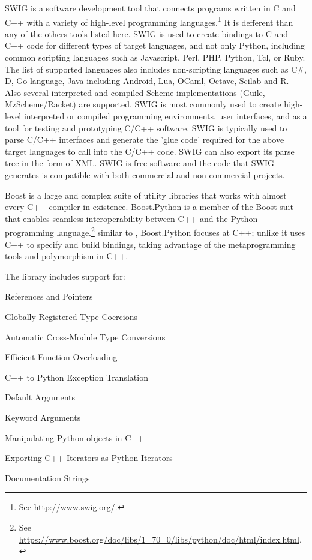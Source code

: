
SWIG is a software development tool that connects programs written in
C and C++ with a variety of high-level programming
languages.\footnote{See \url{http://www.swig.org/}.}  It is defferent
than any of the others tools listed here.  SWIG is used to create
bindings to C and C++ code for different types of target languages,
and not only Python, including common scripting languages such as
Javascript, Perl, PHP, Python, Tcl, or Ruby. The list of supported
languages also includes non-scripting languages such as C\#, D, Go
language, Java including Android, Lua, OCaml, Octave, Scilab and
R. Also several interpreted and compiled Scheme implementations
(Guile, MzScheme/Racket) are supported. SWIG is most commonly used to
create high-level interpreted or compiled programming environments,
user interfaces, and as a tool for testing and prototyping C/C++
software. SWIG is typically used to parse C/C++ interfaces and
generate the 'glue code' required for the above target languages to
call into the C/C++ code. SWIG can also export its parse tree in the
form of XML. SWIG is free software and the code that SWIG generates is
compatible with both commercial and non-commercial projects.

Boost is a large and complex suite of utility libraries that works
with almost every C++ compiler in existence. Boost.Python is a member
of the Boost suit that enables seamless interoperability between C++
and the Python programming language.\footnote{See
  \url{https://www.boost.org/doc/libs/1_70_0/libs/python/doc/html/index.html}.}
similar to , Boost.Python focuses at C++; unlike
 it uses C++ to specify and build bindings, taking
advantage of the metaprogramming tools and polymorphism in C++.

The library includes support for:
\begin{compactitem}
\item References and Pointers
\item Globally Registered Type Coercions
\item Automatic Cross-Module Type Conversions
\item Efficient Function Overloading
\item C++ to Python Exception Translation
\item Default Arguments
\item Keyword Arguments
\item Manipulating Python objects in C++
\item Exporting C++ Iterators as Python Iterators
\item Documentation Strings
\end{compactitem}

